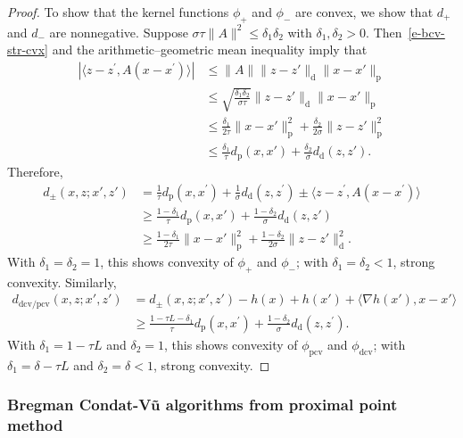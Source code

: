 \documentclass[letterpaper,11pt]{article}
\newcommand{\inprod}[2]{\langle#1, #2\rangle}
\newcommand{\primal}{\mathrm p}
\newcommand{\dual}{\mathrm d}
\begin{document}
\begin{proof}
To show that the kernel functions $\phi_+$ and $\phi_-$ are convex,
we show that $d_+$ and $d_-$ are nonnegative.
Suppose $\sigma\tau \|A\|^2 \leq \delta_1 \delta_2$
with $\delta_1,\delta_2 > 0$.
Then~\eqref{e-bcv-str-cvx} and the arithmetic--geometric mean inequality
imply that
\begin{align}
\left| \inprod{z-z^\prime}{A(x-x^\prime)}\right|
  &\leq \|A\| \|z-z'\|_\dual \|x-x'\|_\primal  \nonumber \\
&\leq \sqrt{\frac{\delta_1 \delta_2}{\sigma \tau}}
\|z-z'\|_\dual \|x-x'\|_\primal \nonumber \\
&\leq \frac{\delta_1}{2\tau} \|x-x'\|_\primal^2  +
  \frac{\delta_2}{2\sigma} \|z-z'\|_\primal^2 \nonumber \\
&\leq \frac{\delta_1}{\tau} d_\primal (x,x') +
  \frac{\delta_2}{\sigma} d_\dual (z,z'). \label{e-bcv-delta}
\end{align}
Therefore,
\begin{align*}
d_{\pm} (x,z; x',z')
  &= \frac{1}{\tau} d_\primal(x,x^\prime) + \frac{1}{\sigma}
  d_\dual(z,z^\prime) \pm \inprod{z-z^\prime}{A(x-x^\prime)} \\
&\geq \frac{1-\delta_1}{\tau} d_\primal (x,x') +
  \frac{1-\delta_2}{\sigma} d_\dual (z,z') \\
&\geq \frac{1-\delta_1}{2\tau} \|x-x'\|_\primal^2 +
  \frac{1-\delta_2}{2\sigma} \|z-z'\|_\dual^2.
\end{align*}
With $\delta_1=\delta_2=1$, this shows convexity of $\phi_+$ and $\phi_-$;
with $\delta_1=\delta_2<1$, strong convexity.
Similarly,
\begin{align*}
d_\mathrm{dcv/pcv} (x,z; x', z')
  &= d_{\pm} (x,z; x',z') - h(x) + h(x') + \inprod{\nabla h(x')}{x-x'} \\
&\geq \frac{1-\tau L-\delta_1}{\tau} d_\primal (x,x^\prime) +
  \frac{1-\delta_2}{\sigma} d_\dual (z,z^\prime).
\end{align*}
With $\delta_1=1-\tau L$ and $\delta_2=1$, this shows convexity of
$\phi_\mathrm{pcv}$ and $\phi_\mathrm{dcv}$;
with $\delta_1=\delta-\tau L$ and $\delta_2=\delta < 1$,
strong convexity.
\end{proof}

\subsubsection{Bregman Condat-V\~u algorithms from proximal point method}
\end{document}
